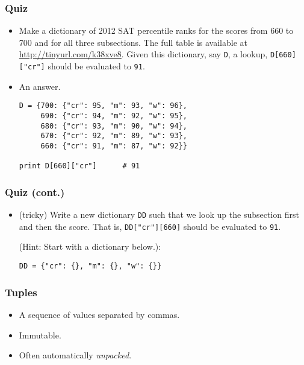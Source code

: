 \documentclass{beamer}
\begin{document}
\begin{frame}[fragile]
\frametitle{Quiz}
\begin{itemize}
\item<1-> Make a dictionary of 2012
      SAT percentile ranks for the scores
      from 660 to 700 and for all three subsections.
      The full table is available at 
      \url{http://tinyurl.com/k38xve8}.
      Given this dictionary, say \lstinline{D},
      a lookup, \lstinline{D[660]["cr"]}
      should be evaluated to \lstinline{91}.
\item<2-> An answer.
\begin{lstlisting}
D = {700: {"cr": 95, "m": 93, "w": 96},
     690: {"cr": 94, "m": 92, "w": 95},
     680: {"cr": 93, "m": 90, "w": 94}, 
     670: {"cr": 92, "m": 89, "w": 93},
     660: {"cr": 91, "m": 87, "w": 92}}

print D[660]["cr"]      # 91
\end{lstlisting}
\end{itemize}
\end{frame}

\begin{frame}[fragile]
\frametitle{Quiz (cont.)}
\begin{itemize}
\item (tricky) Write a new dictionary \lstinline{DD} such that
     we look up the subsection first and then
     the score. That is,
     \lstinline{DD["cr"][660]} should be
     evaluated to \lstinline{91}.
 
     (Hint: Start with a dictionary below.):
\begin{lstlisting}
DD = {"cr": {}, "m": {}, "w": {}}
\end{lstlisting} 
\end{itemize}
\end{frame}

\begin{frame}[fragile]
\frametitle{Tuples}
\begin{itemize}
\item A sequence of values separated by commas.
\item Immutable.
\item Often automatically \emph{unpacked}.
\end{itemize}
\end{frame}
\end{document}

